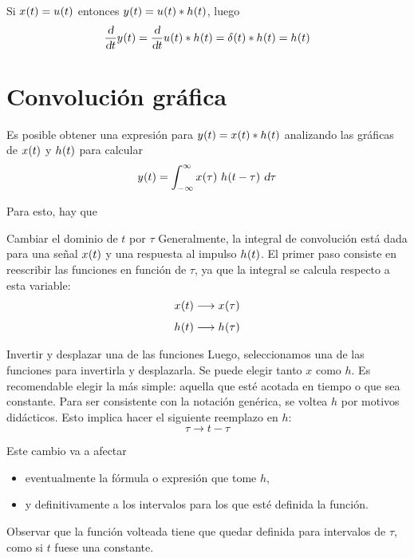 Si $\fx[x]{t} = \fx[u]{t}$ entonces $\fx[y]{t} = \fx[u]{t} * \fx[h]{t}$, luego
\[
    \deriv{t} \fx[y]{t} = \deriv{t} \fx[u]{t} * \fx[h]{t} = \fx[\delta]{t} * \fx[h]{t} = \fx[h]{t}
\]

\section{Convolución gráfica}

Es posible obtener una expresión para $\fx[y]{t} = \fx[x]{t} * \fx[h]{t}$ analizando las gráficas de $\fx[x]{t}$ y $\fx[h]{t}$ para calcular
\[
    \fx[y]{t} = \convol{x}
\]

Para esto, hay que

\begin{numset}
    \begin{numitem}{Cambiar el dominio de $t$ por $\tau$}
        Generalmente, la integral de convolución está dada para una señal $\fx[x]{t}$ y una respuesta al impulso $\fx[h]{t}$.
        El primer paso consiste en reescribir las funciones en función de $\tau$, ya que la integral se calcula respecto a esta variable:
        \begin{align*}
            \fx[x]{t} & \longrightarrow \fx[x]{\tau}
            \\[1ex]
            \fx[h]{t} & \longrightarrow \fx[h]{\tau}
        \end{align*}
    \end{numitem}

    \begin{numitem}{Invertir y desplazar una de las funciones}
        Luego, seleccionamos una de las funciones para invertirla y desplazarla.
        Se puede elegir tanto $x$ como $h$.
        Es recomendable elegir la más simple: aquella que esté acotada en tiempo o que sea constante.
        Para ser consistente con la notación genérica, se voltea $h$ por motivos didácticos.
        Esto implica hacer el siguiente reemplazo en $h$:
        \[
            \tau \longrightarrow t - \tau
        \]

        Este cambio va a afectar
        \begin{itemize}
            \item eventualmente la fórmula o expresión que tome $h$,
            \item y definitivamente a los intervalos para los que esté definida la función.
        \end{itemize}

        Observar que la función volteada tiene que quedar definida para intervalos de $\tau$, como si $t$ fuese una constante.
    \end{numitem}


\end{numset}
